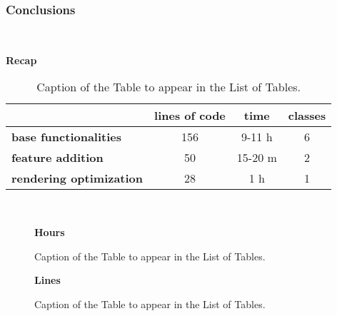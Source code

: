 \subsubsection{Conclusions} \mbox{} \\
\label{subpar:render_optimizations_inherited_widget}
\begin{table}[H]
    \caption*{\textbf{Recap}}
    \centering 
    
    \begin{tabular}{| l | c | c | c |}
    \hline
    \rowcolor{bluepoli!40} %
    \hline
     & \textbf{lines of code} & \textbf{time} & \textbf{classes} \T\B \\
    \hline
    \textbf{base functionalities} & 156 & 9-11 h & 6 \T\B \\ 
    \textbf{feature addition} & 50 & 15-20 m & 2 \T\B\\ 
    \textbf{rendering optimization} & 28 & 1 h & 1
    \T\B\\
    \hline
    \end{tabular}
    \\[10pt]
    \caption{Caption of the Table to appear in the List of Tables.}
    \label{table:example}
\end{table}

\begin{figure}[H]
 \caption*{\textbf{Hours}}
\centering
{}
 \caption{Caption of the Table to appear in the List of Tables.}
\end{figure}
\begin{figure}[H]

\caption*{\textbf{Lines}}
\centering
{}
 \caption{Caption of the Table to appear in the List of Tables.}
\end{figure}

